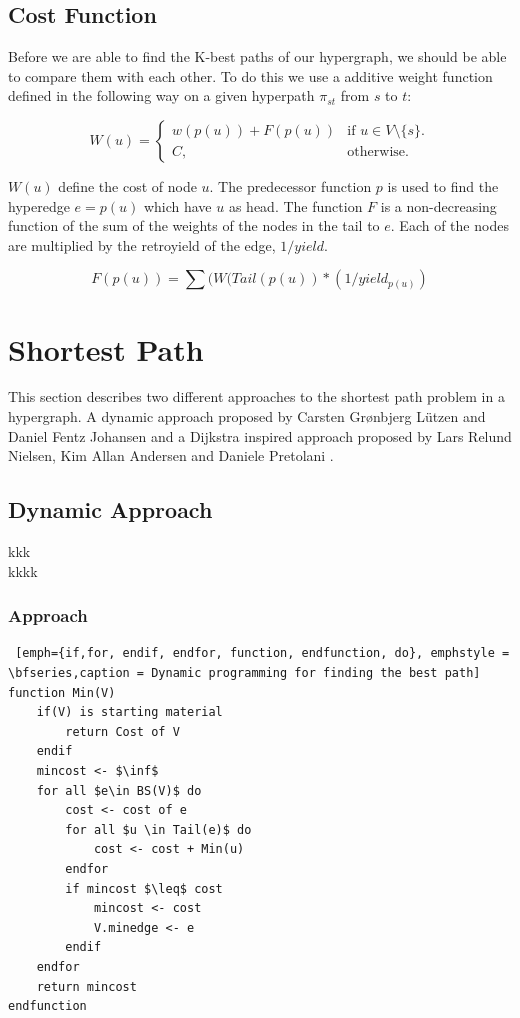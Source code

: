 \documentclass[a4paper,10pt,titlepage]{paper}
\begin{document}
\subsection{Cost Function}
Before we are able to find the K-best paths of our hypergraph, we should be able to compare them with each other. To do this we use a additive weight function defined in the following way on a given hyperpath $\pi_{st}$ from $s$ to $t$:

\begin{equation}
W(u)=\begin{cases}
    w(p(u)) + F(p(u)) & \text{if $u\in V\setminus \{s\}$}.\\
    C, & \text{otherwise}.
  \end{cases}
\end{equation}

$W(u)$ define the cost of node $u$. The predecessor function $p$ is used to find the hyperedge $e=p(u)$ which have $u$ as head. The function $F$ is a non-decreasing function of the sum of the weights of the nodes in the tail to $e$. Each of the nodes are multiplied by the retroyield of the edge, $1/yield$.

\begin{equation}
F(p(u)) = \sum(W(Tail(p(u)) * (1/yield_{p(u)})
\end{equation}

\section{Shortest Path}
This section describes two different approaches to the shortest path problem in a hypergraph. A dynamic approach proposed by Carsten Grønbjerg Lützen and Daniel Fentz Johansen \cite{Carsten} and a Dijkstra inspired approach proposed by Lars Relund Nielsen, Kim Allan Andersen and Daniele Pretolani \cite{Nielsen}. 

\subsection{Dynamic Approach}
kkk \cite{Carsten}\\
kkkk \cite{Fagerberg}\\

\subsubsection{Approach}
\begin{lstlisting} [emph={if,for, endif, endfor, function, endfunction, do}, emphstyle = \bfseries,caption = Dynamic programming for finding the best path]
function Min(V)
	if(V) is starting material 
		return Cost of V
	endif
	mincost <- $\inf$
	for all $e\in BS(V)$ do
		cost <- cost of e
		for all $u \in Tail(e)$ do
			cost <- cost + Min(u)
		endfor
		if mincost $\leq$ cost 
			mincost <- cost
			V.minedge <- e
		endif
	endfor
	return mincost
endfunction
\end{lstlisting}
\end{document}
